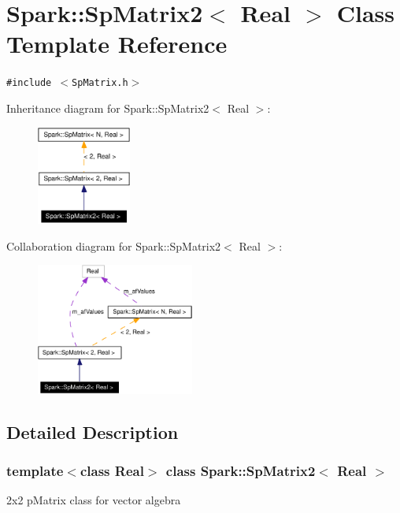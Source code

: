 \section{Spark::Sp\-Matrix2$<$ Real $>$ Class Template Reference}
\label{classSpark_1_1SpMatrix2}
{\tt \#include $<$Sp\-Matrix.h$>$}

Inheritance diagram for Spark::Sp\-Matrix2$<$ Real $>$:\begin{figure}[H]
\begin{center}
\leavevmode
\includegraphics[width=88pt]{classSpark_1_1SpMatrix2__inherit__graph}
\end{center}
\end{figure}
Collaboration diagram for Spark::Sp\-Matrix2$<$ Real $>$:\begin{figure}[H]
\begin{center}
\leavevmode
\includegraphics[width=147pt]{classSpark_1_1SpMatrix2__coll__graph}
\end{center}
\end{figure}


\subsection{Detailed Description}
\subsubsection*{template$<$class Real$>$ class Spark::Sp\-Matrix2$<$ Real $>$}

2x2 p\-Matrix class for vector algebra 

